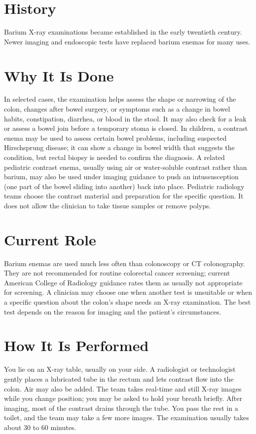 \section*{History}
Barium X-ray examinations became established in the early twentieth century. Newer imaging and endoscopic tests have replaced barium enemas for many uses.

\section*{Why It Is Done}
In selected cases, the examination helps assess the shape or narrowing of the colon, changes after bowel surgery, or symptoms such as a change in bowel habits, constipation, diarrhea, or blood in the stool. It may also check for a leak or assess a bowel join before a temporary stoma is closed. In children, a contrast enema may be used to assess certain bowel problems, including suspected Hirschsprung disease; it can show a change in bowel width that suggests the condition, but rectal biopsy is needed to confirm the diagnosis. A related pediatric contrast enema, usually using air or water-soluble contrast rather than barium, may also be used under imaging guidance to push an intussusception (one part of the bowel sliding into another) back into place. Pediatric radiology teams choose the contrast material and preparation for the specific question. It does not allow the clinician to take tissue samples or remove polyps.

\section*{Current Role}
Barium enemas are used much less often than colonoscopy or CT colonography. They are not recommended for routine colorectal cancer screening; current American College of Radiology guidance rates them as usually not appropriate for screening. A clinician may choose one when another test is unsuitable or when a specific question about the colon's shape needs an X-ray examination. The best test depends on the reason for imaging and the patient's circumstances.

\section*{How It Is Performed}
You lie on an X-ray table, usually on your side. A radiologist or technologist gently places a lubricated tube in the rectum and lets contrast flow into the colon. Air may also be added. The team takes real-time and still X-ray images while you change position; you may be asked to hold your breath briefly. After imaging, most of the contrast drains through the tube. You pass the rest in a toilet, and the team may take a few more images. The examination usually takes about 30 to 60 minutes.

